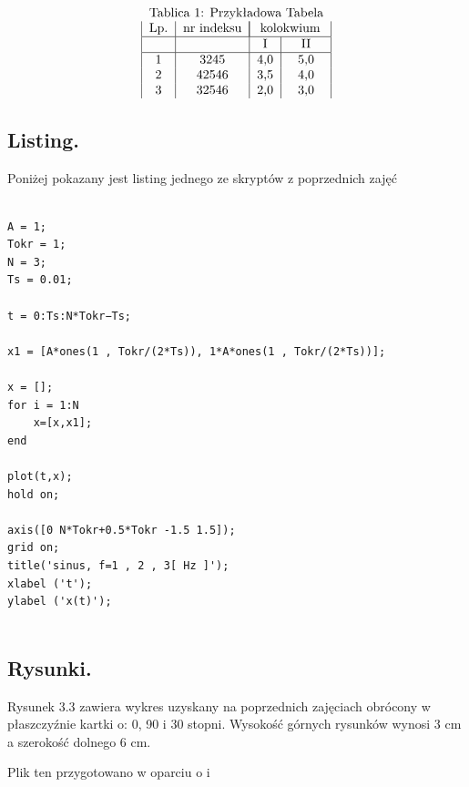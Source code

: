 \documentclass[a4paper,11pt]{article}
\begin{document}
$$\begin{tabular}{|c|c|c|c|}
\multicolumn{4}{c}{Tablica 1: Przykładowa Tabela}\\
Lp. & nr indeksu & \multicolumn{2}{|c|}{kolokwium}\\
\hline
&&I&II\\
\hline
1&3245&4,0&5,0\\
2&42546&3,5&4,0\\
3&32546&2,0&3,0
\end{tabular}$$


\subsection{Listing.}
Poniżej pokazany jest listing jednego ze skryptów z poprzednich zajęć

\lstset{language = Matlab}
\begin{lstlisting}

A = 1;
Tokr = 1;
N = 3;
Ts = 0.01;

t = 0:Ts:N*Tokr−Ts;

x1 = [A*ones(1 , Tokr/(2*Ts)), 1*A*ones(1 , Tokr/(2*Ts))];

x = [];
for i = 1:N
    x=[x,x1];
end

plot(t,x);
hold on;

axis([0 N*Tokr+0.5*Tokr -1.5 1.5]);
grid on;
title('sinus, f=1 , 2 , 3[ Hz ]');
xlabel ('t');
ylabel ('x(t)');


\end{lstlisting}

\subsection{Rysunki.}
Rysunek 3.3 zawiera wykres uzyskany na poprzednich zajęciach obrócony w
płaszczyźnie kartki o: 0, 90 i 30 stopni. Wysokość górnych rysunków wynosi
3 cm a szerokość dolnego 6 cm.\newline

Plik ten przygotowano w oparciu o \cite{czworeczka} i \cite{piateczka}
\end{document}
